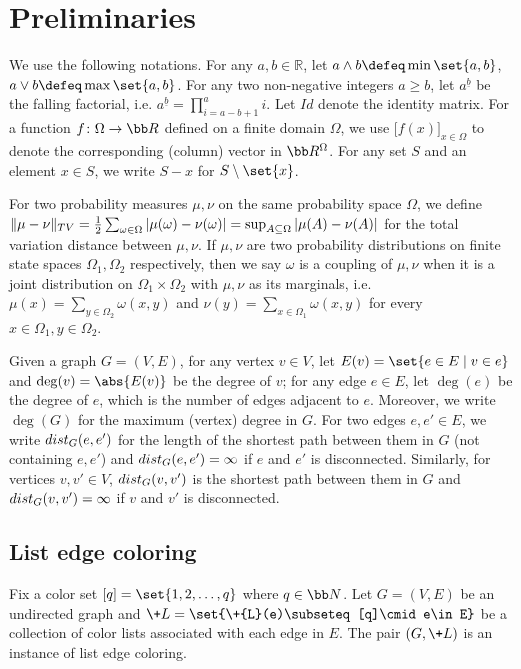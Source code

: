 \documentclass[a4paper,11pt]{article}
\begin{document}
\section{Preliminaries}\label{sec:prelim}
We use the following notations. For any $a, b\in \mathbb R$, let $
    a\wedge b\defeq \min\set{a, b}$, $
    a\vee b\defeq \max\set{a, b}$. For any two non-negative integers $a\ge b$, let $a^{\underline{b}}$ be the falling factorial, i.e. $a^{\underline{b}}=\prod_{i=a-b+1}^a i$.
Let $\!{Id}$ denote the identity matrix. For a function $f\colon \Omega\to\bb R$ defined on a finite domain $\Omega$, we use $\Big[f(x)\Big]_{x\in\Omega}$ to denote the corresponding (column) vector in $\bb R^{\Omega}$. For any set $S$ and an element $x\in S$, we write $S-x$ for $S\setminus \set{x}$.

For two probability measures $\mu, \nu$ on the same probability space $\Omega$, we define $\|\mu-\nu\|_{\-{TV}}=\frac{1}{2} \sum_{\omega \in \Omega}|\mu(\omega)-\nu(\omega)|=\sup _{A \subseteq \Omega}|\mu(A)-\nu(A)|$ for the total variation distance between $\mu, \nu$. If $\mu, \nu$ are two probability distributions on finite state spaces $\Omega_1, \Omega_2$ respectively, then we say $\omega$ is a coupling of $\mu, \nu$ when it is a joint distribution on $\Omega_1 \times \Omega_2$ with $\mu, \nu$ as its marginals, i.e. $\mu(x)=\sum_{y \in \Omega_2} \omega(x, y)$ and $\nu(y)=\sum_{x \in \Omega_1} \omega(x, y)$ for every $x \in \Omega_1, y \in \Omega_2$.

Given a graph $G=(V,E)$, for any vertex $v\in V$, let $E(v)= \set{e\in E \mid  v\in e}$ and $\deg(v)=\abs{E(v)}$ be the degree of $v$; for any edge $e \in E$, let $\deg(e)$ be the degree of $e$, which is the number of edges adjacent to $e$. Moreover, we write $\deg(G)$ for the maximum (vertex) degree in $G$.
For  two edges $e,e'\in E$, we write $\-{dist}_G(e, e')$ for the length of the shortest path between them in $G$ (not containing $e,e'$) and $\-{dist}_G(e, e') = \infty$ if $e$ and $e'$ is disconnected. 
Similarly, for vertices $v,v'\in V$, $\-{dist}_G(v,v')$ is the shortest path between them in $G$ and $\-{dist}_G(v, v') = \infty$ if $v$ and $v'$ is disconnected.

\subsection{List edge coloring}
Fix a color set $[q]=\set{1, 2, \dots, q}$ where $q\in\bb N$. Let $G=(V,E)$ be an undirected graph and $\+L=\set{\+{L}(e)\subseteq[q]\cmid e\in E}$ be a collection of color lists associated with each edge in $E$. The pair $(G, \+L)$  is an instance of list edge coloring. 
\end{document}
